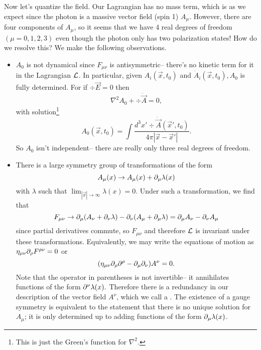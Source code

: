 Now let's quantize the field. Our Lagrangian has no mass term, which is as we expect since the photon is a massive vector field (spin 1) $A_\mu$. However, there are four components of $A_\mu$, so it seems that we have 4 real degrees of freedom $(\mu=0,1,2,3)$ even though the photon only has two polarization states! How do we resolve this? We make the following observations.
\begin{itemize}
    \item $A_0$ is not dynamical since $F_{\mu\nu}$ is antisymmetric-- there's no kinetic term for it in the Lagrangian $\mathcal L$. In particular, given $A_i(\vec x,t_0)$ and $\dot A_i(\vec x,t_0), A_0$ is fully determined. For if $\div \vec E=0$ then
    $$\nabla^2 A_0 +\div \dot{\vec A}=0,$$
    with solution\footnote{This is just the Green's function for $\nabla^2$.}
    \begin{equation}\label{a0solution}
        A_0(\vec x,t_0)=\int \frac{d^3x' \div \dot{\vec A}(\vec x',t_0)}{4\pi|\vec x-\vec x'|}.
    \end{equation}
    So $A_0$ isn't independent-- there are really only three real degrees of freedom.
    \item There is a large symmetry group of transformations of the form
    $$A_\mu(x)\to A_\mu(x)+\partial_\mu \lambda(x)$$
    with $\lambda$ such that $\lim_{|\vec x|\to \infty }\lambda(x)=0$. Under such a transformation, we find that
    $$F_{\mu\nu}\to \partial_\mu(A_\nu+\partial_\nu \lambda)-\partial_\nu(A_\mu+\partial_\mu\lambda)=\partial_\mu A_\nu -\partial_\nu A_\mu$$
    since partial derivatives commute, so $F_{\mu\nu}$ and therefore $\mathcal L$ is invariant under these transformations. Equivalently, we may write the equations of motion as $\eta_{\mu\nu}\partial_\rho F^{\rho\nu}=0$ or
    $$(\eta_{\mu\nu}\partial_\rho \partial^\rho -\partial_\mu \partial_\nu)A^\nu =0.$$
    Note that the operator in parentheses is not invertible-- it annihilates functions of the form $\partial^\nu \lambda(x).$ Therefore there is a redundancy in our description of the vector field $A^\nu$, which we call a . The existence of a gauge symmetry is equivalent to the statement that there is no unique solution for $A_\mu$; it is only determined up to adding functions of the form $\partial_\mu \lambda(x)$.
\end{itemize}

